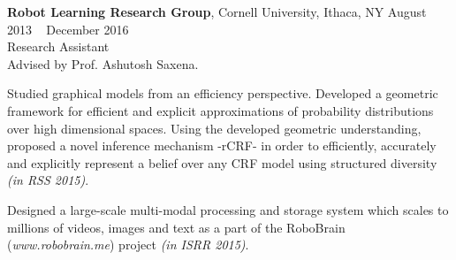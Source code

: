     \textbf{Robot Learning Research Group}, Cornell University, Ithaca, NY \hfill August 2013 \textendash ~ December 2016\vspace{0.5mm}\\\vspace{0mm}
    \hspace{-1mm}Research Assistant  \hfill \vspace{0.5mm} \\
  Advised by Prof. Ashutosh Saxena.

Studied graphical models from an efficiency perspective. Developed a geometric framework for efficient and explicit approximations of probability distributions over high dimensional spaces. Using the developed geometric understanding, proposed a novel inference mechanism -rCRF- in order to efficiently, accurately and explicitly represent a belief over any CRF model using structured diversity \emph{(in RSS 2015)}. 

Designed a large-scale multi-modal processing and storage system which scales to millions of videos, images and text as a part of the RoboBrain (\emph{www.robobrain.me}) project \emph{(in ISRR 2015)}.
